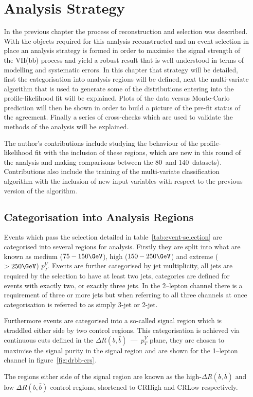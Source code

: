 \chapter{Analysis Strategy}%
\label{ch:strategy}
In the previous chapter the process of reconstruction and selection was
described. With the objects required for this analysis reconstructed and an
event selection in place an analysis strategy is formed in order to maximise the
signal strength of the VH(bb) process and yield a robust result that is well
understood in terms of modelling and systematic errors. In this chapter that
strategy will be detailed, first the categorisation into analysis regions will
be defined, next the multi-variate algorithm that is used to generate some of
the distributions entering into the profile-likelihood fit will be explained.
Plots of the data versus Monte-Carlo prediction will then be shown in order to
build a picture of the pre-fit status of the agreement. Finally a series of
cross-checks which are used to validate the methods of the analysis will be
explained.

The author's contributions include studying the behaviour of the
profile-likelihood fit with the inclusion of these regions, which are new in
this round of the analysis and making comparisons between the 80~\invfb and
140~\invfb datasets). Contributions also include the training of the
multi-variate classification algorithm with the inclusion of new input variables
with respect to the previous version of the algorithm.

\section{Categorisation into Analysis Regions}
\label{sec:ana-regions}

Events which pass the selection detailed in table~\ref{tab:event-selection} are
categorised into several regions for analysis. Firstly they are split into what
are known as medium ($75 - 150 \GeV$), high ($150 - 250 \GeV$) and extreme ($ >
250 \GeV$) $p_T^{V}$. Events are further categorised by jet multiplicity, all
jets are required by the selection to have at least two jets, categories are
defined for events with exactly two, or exactly three jets. In the 2--lepton
channel there is a requirement of three or more jets but when referring to all
three channels at once categorisation is referred to as simply 3-jet or 2-jet.

Furthermore events are categorised into a so-called signal region which is
straddled either side by two control regions. This categorisation is achieved
via continuous cuts defined in the $\Delta R(b, \bar{b})$~---~$p_T^{V}$ plane,
they are chosen to maximise the signal purity in the signal region and are shown
for the 1--lepton channel in figure~\ref{fig:drbb-crs}.

The regions either side of the signal region are known as the
high-$\Delta R(b, \bar{b})$ and low-$\Delta R(b, \bar{b})$ control regions,
shortened to CRHigh and CRLow respectively.

